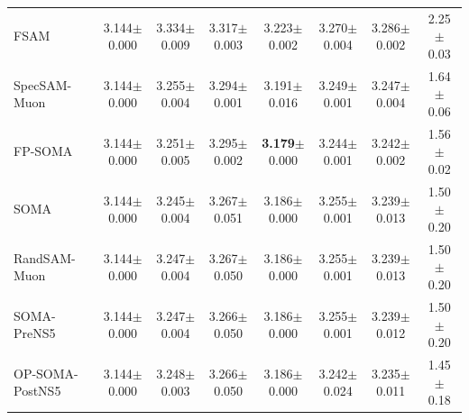 \begin{table}[t]
{\begin{tabular}{lccccccc}
    FSAM & 3.144{\scriptsize$\pm$0.000} & 3.334{\scriptsize$\pm$0.009} & 3.317{\scriptsize$\pm$0.003} & 3.223{\scriptsize$\pm$0.002} & 3.270{\scriptsize$\pm$0.004} & 3.286{\scriptsize$\pm$0.002} & 2.25{\scriptsize$\pm$0.03} \\
    SpecSAM-Muon & 3.144{\scriptsize$\pm$0.000} & 3.255{\scriptsize$\pm$0.004} & 3.294{\scriptsize$\pm$0.001} & 3.191{\scriptsize$\pm$0.016} & 3.249{\scriptsize$\pm$0.001} & 3.247{\scriptsize$\pm$0.004} & 1.64{\scriptsize$\pm$0.06} \\
    FP-SOMA & 3.144{\scriptsize$\pm$0.000} & 3.251{\scriptsize$\pm$0.005} & 3.295{\scriptsize$\pm$0.002} & \textbf{3.179}{\scriptsize$\pm$0.000} & 3.244{\scriptsize$\pm$0.001} & 3.242{\scriptsize$\pm$0.002} & 1.56{\scriptsize$\pm$0.02} \\
    SOMA & 3.144{\scriptsize$\pm$0.000} & 3.245{\scriptsize$\pm$0.004} & 3.267{\scriptsize$\pm$0.051} & 3.186{\scriptsize$\pm$0.000} & 3.255{\scriptsize$\pm$0.001} & 3.239{\scriptsize$\pm$0.013} & 1.50{\scriptsize$\pm$0.20} \\
    RandSAM-Muon & 3.144{\scriptsize$\pm$0.000} & 3.247{\scriptsize$\pm$0.004} & 3.267{\scriptsize$\pm$0.050} & 3.186{\scriptsize$\pm$0.000} & 3.255{\scriptsize$\pm$0.001} & 3.239{\scriptsize$\pm$0.013} & 1.50{\scriptsize$\pm$0.20} \\
    SOMA-PreNS5 & 3.144{\scriptsize$\pm$0.000} & 3.247{\scriptsize$\pm$0.004} & 3.266{\scriptsize$\pm$0.050} & 3.186{\scriptsize$\pm$0.000} & 3.255{\scriptsize$\pm$0.001} & 3.239{\scriptsize$\pm$0.012} & 1.50{\scriptsize$\pm$0.20} \\
    OP-SOMA-PostNS5 & 3.144{\scriptsize$\pm$0.000} & 3.248{\scriptsize$\pm$0.003} & 3.266{\scriptsize$\pm$0.050} & 3.186{\scriptsize$\pm$0.000} & 3.242{\scriptsize$\pm$0.024} & 3.235{\scriptsize$\pm$0.011} & 1.45{\scriptsize$\pm$0.18} \\
    \bottomrule
  \end{tabular}}
\end{table}

